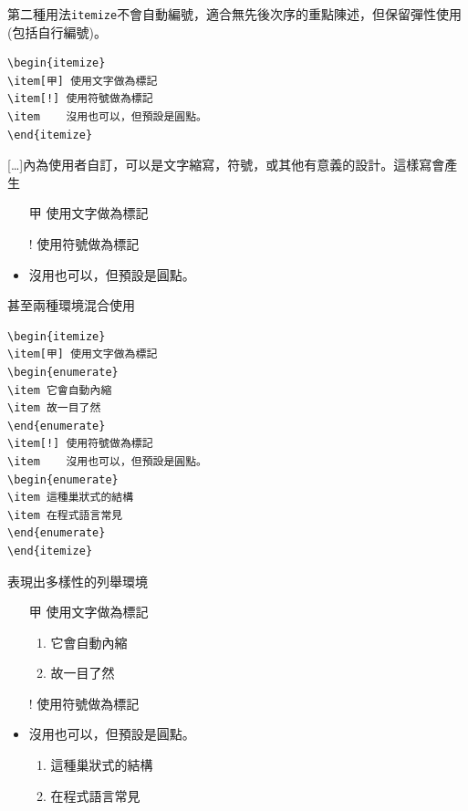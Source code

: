第二種用法{\tt itemize}不會自動編號，適合無先後次序的重點陳述，但保留彈性使用(包括自行編號)。
\begin{Verbatim}[frame=single,firstline=1,label=Itemize]
\begin{itemize}
\item[甲] 使用文字做為標記
\item[!] 使用符號做為標記
\item    沒用也可以，但預設是圓點。
\end{itemize}
\end{Verbatim}
[\ldots]內為使用者自訂，可以是文字縮寫，符號，或其他有意義的設計。這樣寫會產生
\begin{itemize}
\item[甲] 使用文字做為標記
\item[!] 使用符號做為標記
\item    沒用也可以，但預設是圓點。
\end{itemize}
甚至兩種環境混合使用
\begin{Verbatim}[frame=single,firstline=1,label=Enumerate+Itemize]
\begin{itemize}
\item[甲] 使用文字做為標記
\begin{enumerate}
\item 它會自動內縮
\item 故一目了然
\end{enumerate}
\item[!] 使用符號做為標記
\item    沒用也可以，但預設是圓點。
\begin{enumerate}
\item 這種巢狀式的結構
\item 在程式語言常見
\end{enumerate}
\end{itemize}
\end{Verbatim}
表現出多樣性的列舉環境
\begin{itemize}
\item[甲] 使用文字做為標記
\begin{enumerate}
\item 它會自動內縮
\item 故一目了然
\end{enumerate}
\item[!] 使用符號做為標記
\item    沒用也可以，但預設是圓點。
\begin{enumerate}
\item 這種巢狀式的結構
\item 在程式語言常見
\end{enumerate}
\end{itemize}

